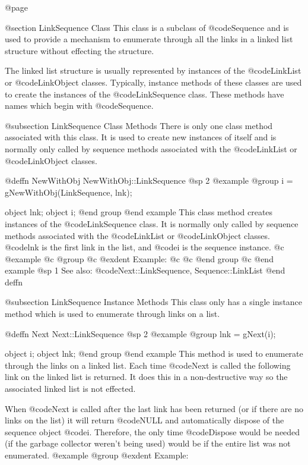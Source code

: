 @page

@section LinkSequence Class
This class is a subclass of @code{Sequence} and is used to provide a
mechanism to enumerate through all the links in a linked list structure
without effecting the structure.

The linked list structure is usually represented by instances of the
@code{LinkList} or @code{LinkObject} classes.  Typically, instance
methods of these classes are used to create the instances of the
@code{LinkSequence} class.  These methods have names which begin with
@code{Sequence}.



@subsection LinkSequence Class Methods
There is only one class method associated with this class.  It is used
to create new instances of itself and is normally only called by
sequence methods associated with the @code{LinkList} or @code{LinkObject}
classes.





@deffn {NewWithObj} NewWithObj::LinkSequence
@sp 2
@example
@group
i = gNewWithObj(LinkSequence, lnk);

object  lnk;
object  i;
@end group
@end example
This class method creates instances of the @code{LinkSequence} class.
It is normally only called by sequence methods associated with the
@code{LinkList} or @code{LinkObject} classes.  @code{lnk} is the first
link in the list, and @code{i} is the sequence instance.
@c @example
@c @group
@c @exdent Example:
@c 
@c @end group
@c @end example
@sp 1
See also:  @code{Next::LinkSequence, Sequence::LinkList}
@end deffn




@subsection LinkSequence Instance Methods
This class only has a single instance method which is used to enumerate
through links on a list.






@deffn {Next} Next::LinkSequence
@sp 2
@example
@group
lnk = gNext(i);

object  i;
object  lnk;
@end group
@end example
This method is used to enumerate through the links on a linked list.
Each time @code{Next} is called the following link on the linked list
is returned.  It does this in a non-destructive way so the associated
linked list is not effected.

When @code{Next} is called after the last link has been returned (or
if there are no links on the list) it will return @code{NULL} and
automatically dispose of the sequence object @code{i}.  Therefore,
the only time @code{Dispose} would be needed (if the garbage collector
weren't being used) would be if the entire list was not enumerated.
@example
@group
@exdent Example:

